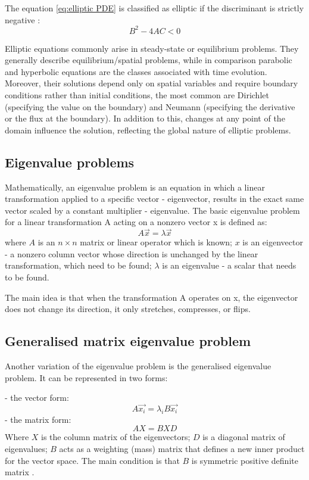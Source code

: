 \documentclass[acmsmall,screen]{MapleTrans}
\begin{document}
The equation \eqref{eq:elliptic PDE} is classified as elliptic if the discriminant is strictly negative \cite{b0}:
\begin{equation}
    B^2 - 4AC < 0
\end{equation}

Elliptic equations commonly arise in steady-state or equilibrium problems. They generally describe equilibrium/spatial problems, while in comparison parabolic and hyperbolic equations are the classes associated with time evolution.
Moreover, their solutions depend only on spatial variables and require boundary conditions rather than initial conditions, the most common are Dirichlet (specifying the value on the boundary) and Neumann (specifying the derivative or the flux at the boundary). 
In addition to this, changes at any point of the domain influence the solution, reflecting the global nature of elliptic problems.


\subsection{Eigenvalue problems}
Mathematically, an eigenvalue problem is an equation in which a linear transformation applied to a specific vector - eigenvector, results in the exact same vector scaled by a constant multiplier - eigenvalue. 
The basic eigenvalue problem for a linear transformation A acting on a nonzero vector x is defined as:
\begin{equation}
    A\vec{x} = \lambda\vec{x}
\end{equation}
where $A$ is an $n \times n$ matrix or linear operator which is known; $x$ is an eigenvector - a nonzero column vector whose direction is unchanged by the linear transformation, which need to be found; $\lambda$ is an eigenvalue - a scalar that needs to be found.

The main idea is that when the transformation A operates on x, the eigenvector does not change its direction, it only stretches, compresses, or flips.


\subsection{Generalised matrix eigenvalue problem}
Another variation of the eigenvalue problem is the generalised eigenvalue problem. It can be represented in two forms:

- the vector form:
\begin{equation}
    A\vec{x_{i}} = \lambda_{i}B\vec{x_{i}}
\end{equation}
- the matrix form:
\begin{equation}
    AX = BXD
\end{equation}
Where $X$ is the column matrix of the eigenvectors; $D$ is a diagonal matrix of eigenvalues; $B$ acts as a weighting (mass) matrix that defines a new inner product for the vector space. The main condition is that $B$ is symmetric positive definite matrix \cite{b3}. 
\end{document}
